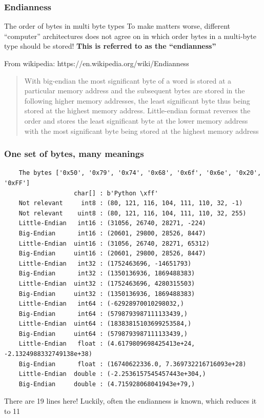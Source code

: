 \documentclass{beamer}
\begin{document}
\begin{frame}[fragile]
  \frametitle{Endianness}
  \begin{alertblock}{The order of bytes in multi byte types}
    To make matters worse, different ``computer'' architectures does
    not agree on in which order bytes in a multi-byte type should be
    stored!\newline
    \newline
    \textbf{This is referred to as the ``endianness''}
  \end{alertblock}
  \vspace{0.5cm}
  \small
  From wikipedia: https://en.wikipedia.org/wiki/Endianness\newline
  \begin{quotation}
    With big-endian the most significant byte of a word is stored at a
    particular memory address and the subsequent bytes are stored in
    the following higher memory addresses, the least significant byte
    thus being stored at the highest memory address. Little-endian
    format reverses the order and stores the least significant byte at
    the lower memory address with the most significant byte being
    stored at the highest memory address
  \end{quotation}
\end{frame}

\begin{frame}[fragile]
  \frametitle{One set of bytes, many meanings}
  \scriptsize
  \begin{verbatim}
    The bytes ['0x50', '0x79', '0x74', '0x68', '0x6f', '0x6e', '0x20', '0xFF']
                   char[] : b'Python \xff'
    Not relevant     int8 : (80, 121, 116, 104, 111, 110, 32, -1)
    Not relevant    uint8 : (80, 121, 116, 104, 111, 110, 32, 255)
    Little-Endian   int16 : (31056, 26740, 28271, -224)
    Big-Endian      int16 : (20601, 29800, 28526, 8447)
    Little-Endian  uint16 : (31056, 26740, 28271, 65312)
    Big-Endian     uint16 : (20601, 29800, 28526, 8447)
    Little-Endian   int32 : (1752463696, -14651793)
    Big-Endian      int32 : (1350136936, 1869488383)
    Little-Endian  uint32 : (1752463696, 4280315503)
    Big-Endian     uint32 : (1350136936, 1869488383)
    Little-Endian   int64 : (-62928970010298032,)
    Big-Endian      int64 : (5798793987111133439,)
    Little-Endian  uint64 : (18383815103699253584,)
    Big-Endian     uint64 : (5798793987111133439,)
    Little-Endian   float : (4.6179809698425413e+24, -2.1324988332749138e+38)
    Big-Endian      float : (16740622336.0, 7.369732216716093e+28)
    Little-Endian  double : (-2.2536157545457443e+304,)
    Big-Endian     double : (4.715928068041943e+79,)
  \end{verbatim}
  \normalsize
  There are 19 lines here! Luckily, often the endianness is known, which reduces it to 11
\end{frame}
\end{document}
